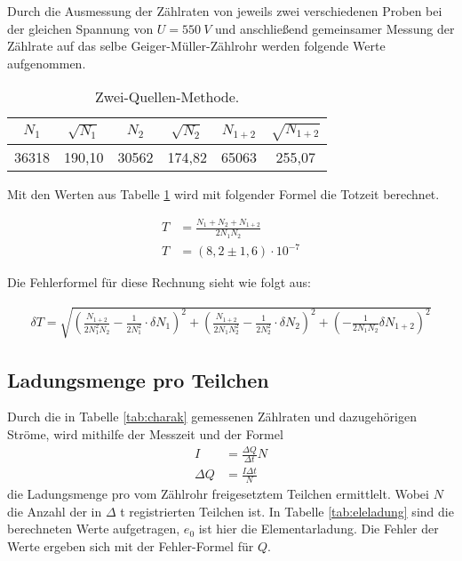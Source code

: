 Durch die Ausmessung der Zählraten von jeweils zwei verschiedenen Proben bei der gleichen Spannung von $U = \SI{550}{V}$ und anschließend gemeinsamer Messung der Zählrate auf das selbe Geiger-Müller-Zählrohr werden folgende Werte aufgenommen.

\begin{table}
  \centering
  \caption{Zwei-Quellen-Methode.}
  \label{tab:zwquellen}
  \begin{tabular}{c c c c c c}
    \toprule
    $N_1$ & $\sqrt{N_1}$ & $N_2$ & $\sqrt{N_2}$ & $N_{1+2}$ & $\sqrt{N_{1+2}}$\\
    \midrule
    36318 & 190,10 & 30562 & 174,82 & 65063 & 255,07 \\
    \bottomrule
  \end{tabular}
\end{table}
\FloatBarrier

Mit den Werten aus Tabelle \ref{tab:zwquellen} wird mit folgender Formel die Totzeit berechnet.

\begin{align*}
  T &= \frac{N_1+N_2+N_{1+2}}{2N_1N_2} \\
  T &= (8,2 \pm 1,6)\cdot 10^{-7}
\end{align*}

Die Fehlerformel für diese Rechnung sieht wie folgt aus:

\begin{align*}
  \delta T = \sqrt{(\frac{N_{1+2}}{2N_1^2N_2}-\frac{1}{2N_1^2}\cdot \delta N_1)^2 + (\frac{N_{1+2}}{2N_1N_2^2}-\frac{1}{2N_2^2}\cdot \delta N_2)^2 + (-\frac{1}{2N_1N_2} \delta N_{1+2})^2}
\end{align*}

\subsection{Ladungsmenge pro Teilchen}
\label{sec:Ladungsmenge}

Durch die in Tabelle \ref{tab:charak} gemessenen Zählraten und dazugehörigen Ströme, wird mithilfe der Messzeit und der Formel
\begin{align*}
  I &= \frac{\Delta Q}{\Delta t} N \\
  \Delta Q &= \frac{I \Delta t}{N}
\end{align*}
die Ladungsmenge pro vom Zählrohr freigesetztem Teilchen ermittlelt.
Wobei $N$ die Anzahl der in $\Delta$ t registrierten Teilchen ist.
In Tabelle \ref{tab:eleladung} sind die berechneten Werte aufgetragen, $e_0$ ist hier die Elementarladung.
Die Fehler der Werte ergeben sich mit der Fehler-Formel für $Q$.

